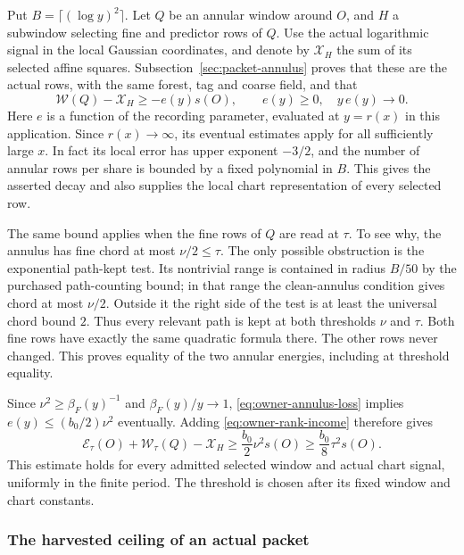 Put $B=\lceil(\log y)^2\rceil$. Let $Q$ be an annular
window around $O$, and $H$ a subwindow selecting fine and
predictor rows of $Q$. Use the actual logarithmic signal in
the local Gaussian coordinates, and denote by
$\mathcal X_H$ the sum of its selected affine squares.
Subsection~\ref{sec:packet-annulus} proves that these are the
actual rows, with the same forest, tag and coarse field, and
that
\begin{equation}\label{eq:owner-annulus-loss}
 \mathcal W(Q)-\mathcal X_H\ge-e(y)s(O),
 \qquad e(y)\ge0,\quad y\,e(y)\longrightarrow0.
\end{equation}
Here $e$ is a function of the recording parameter, evaluated at
$y=r(x)$ in this application. Since $r(x)\to\infty$,
its eventual estimates apply for all sufficiently large $x$.
In fact its local error has upper exponent $-3/2$, and the
number of annular rows per share is bounded by a fixed polynomial
in $B$. This gives the asserted decay and also supplies the
local chart representation of every selected row.

The same bound applies when the fine rows of $Q$ are read at
$\tau$. To see why, the annulus has fine chord at most
$\nu/2\le\tau$. The only possible obstruction is the
exponential path-kept test. Its nontrivial range is contained
in radius $B/50$ by the purchased path-counting bound; in that
range the clean-annulus condition gives chord at most $\nu/2$.
Outside it the right side of the test is at least the universal
chord bound $2$. Thus every relevant path is kept at both
thresholds $\nu$ and $\tau$. Both fine rows have exactly the
same quadratic formula there. The other rows never changed.
This proves equality of the two annular energies, including at
threshold equality.

Since $\nu^2\ge\beta_F(y)^{-1}$ and
$\beta_F(y)/y\to1$, \eqref{eq:owner-annulus-loss} implies
$e(y)\le(b_0/2)\nu^2$ eventually. Adding
\eqref{eq:owner-rank-income} therefore gives
\begin{equation}\label{eq:owner-selected-gain}
 \mathcal E_\tau(O)+\mathcal W_\tau(Q)-\mathcal X_H
 \ge\frac{b_0}{2}\nu^2s(O)
 \ge\frac{b_0}{8}\tau^2s(O).
\end{equation}
This estimate holds for every admitted selected window and
actual chart signal, uniformly in the finite period. The
threshold is chosen after its fixed window and chart constants.

\subsubsection{The harvested ceiling of an actual packet}
\label{subsec:owner-harvested-ceiling}

